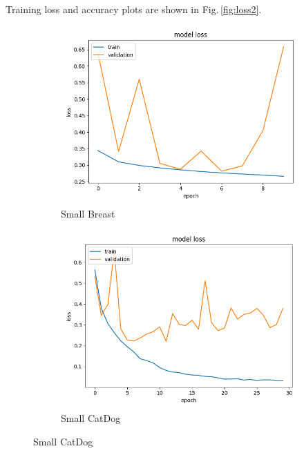 Training loss and accuracy plots are shown in Fig.\,\ref{fig:loss2}. 

\begin{figure}[h]
\centering
\begin{subfigure}[b]{.45\linewidth}
\includegraphics[width=\linewidth]{Figs/small_breast_loss.jpg}
\caption{Small Breast}
\end{subfigure}
\begin{subfigure}[b]{.45\linewidth}
\includegraphics[width=\linewidth]{Figs/small_catdog_loss.jpg}
\caption{Small CatDog}
\end{subfigure}


\end{figure}

